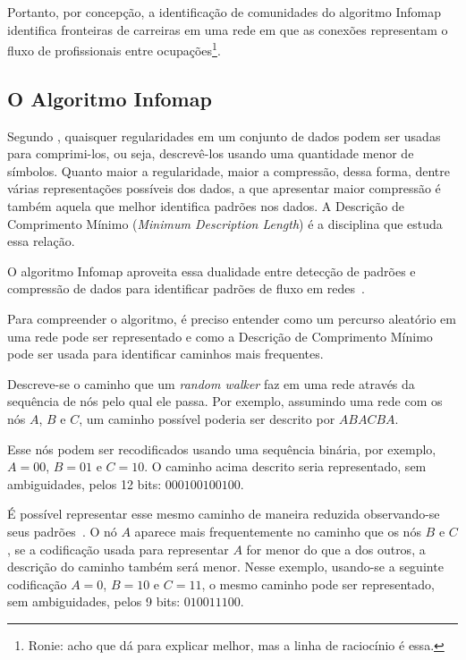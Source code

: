 \documentclass[
  article,
  11pt,
  a4paper,
  english,
  brazil,
  sumario=tradicional]{abntex2}
\begin{document}
Portanto, por concepção, a identificação de comunidades do algoritmo Infomap identifica fronteiras de carreiras em uma rede em que as conexões representam o fluxo de profissionais entre ocupações\footnote{Ronie: acho que dá para explicar melhor, mas a linha de raciocínio é essa.}.

\subsection{O Algoritmo Infomap} \label{sec:infomap}

Segundo , quaisquer regularidades em um conjunto de dados podem ser usadas para comprimi-los, ou seja, descrevê-los usando uma quantidade menor de símbolos. Quanto maior a regularidade, maior a compressão, dessa forma, dentre várias representações possíveis dos dados, a que apresentar maior compressão é também aquela que melhor identifica padrões nos dados. A Descrição de Comprimento Mínimo (\textit{Minimum Description Length}) é a disciplina que estuda essa relação.

O algoritmo Infomap aproveita essa dualidade entre detecção de padrões e compressão de dados para identificar padrões de fluxo em redes~\cite{Rosvall2009-sd}.

Para compreender o algoritmo, é preciso entender como um percurso aleatório em uma rede pode ser representado e como a Descrição de Comprimento Mínimo pode ser usada para identificar caminhos mais frequentes.

Descreve-se o caminho que um \textit{random walker} faz em uma rede através da sequência de nós pelo qual ele passa. Por exemplo, assumindo uma rede com os nós $A$, $B$ e $C$, um caminho possível poderia ser descrito por $ABACBA$.

Esse nós podem ser recodificados usando uma sequência binária, por exemplo, $A = 00$, $B = 01$ e $C = 10$. O caminho acima descrito seria representado, sem ambiguidades, pelos 12 bits: $000100100100$.

É possível representar esse mesmo caminho de maneira reduzida observando-se seus padrões~\cite{Huffman1952-ak}. O nó $A$ aparece mais frequentemente no caminho que os nós $B$ e $C$, se a codificação usada para representar $A$ for menor do que a dos outros, a descrição do caminho também será menor. Nesse exemplo, usando-se a seguinte codificação $A = 0$, $B = 10$ e $C = 11$, o mesmo caminho pode ser representado, sem ambiguidades, pelos 9 bits: $010011100$.
\end{document}
